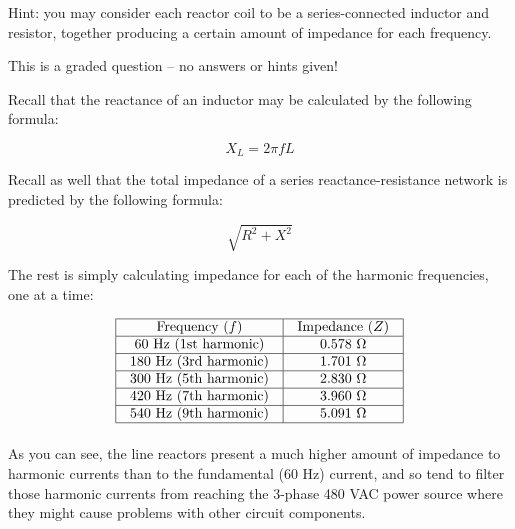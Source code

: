 Hint: you may consider each reactor coil to be a series-connected inductor and resistor, together producing a certain amount of impedance for each frequency.

\vfil

\eject






This is a graded question -- no answers or hints given!
 






Recall that the reactance of an inductor may be calculated by the following formula:

$$X_L = 2 \pi f L$$

Recall as well that the total impedance of a series reactance-resistance network is predicted by the following formula:

$$\sqrt{R^2 + X^2}$$

The rest is simply calculating impedance for each of the harmonic frequencies, one at a time:


$$\vbox{\offinterlineskip
\halign{\strut
\vrule \quad\hfil # \ \hfil & 
\vrule \quad\hfil # \ \hfil \vrule \cr
\noalign{\hrule}
%
Frequency ($f$) & Impedance ($Z$) \cr
%
\noalign{\hrule}
%
60 Hz (1st harmonic) & 0.578 $\Omega$ \cr
%
\noalign{\hrule}
%
180 Hz (3rd harmonic) & 1.701 $\Omega$ \cr
%
\noalign{\hrule}
%
300 Hz (5th harmonic) & 2.830 $\Omega$ \cr
%
\noalign{\hrule}
%
420 Hz (7th harmonic) & 3.960 $\Omega$ \cr
%
\noalign{\hrule}
%
540 Hz (9th harmonic) & 5.091 $\Omega$ \cr
%
\noalign{\hrule}
} %
}$$ %

As you can see, the line reactors present a much higher amount of impedance to harmonic currents than to the fundamental (60 Hz) current, and so tend to filter those harmonic currents from reaching the 3-phase 480 VAC power source where they might cause problems with other circuit components.




